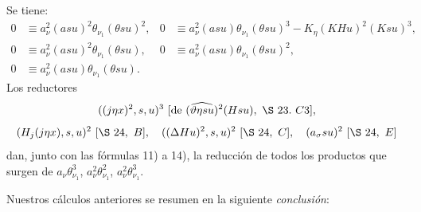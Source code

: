 \documentclass[11pt]{article}
\newcommand{\D}{\Delta}
\begin{document}
Se tiene:
\begin{align*}
0&\equiv a_\nu^2(asu)^2\theta_{\nu_1}(\theta su)^2,
&0&\equiv a_\nu^2(asu)\theta_{\nu_1}(\theta su)^3-K_\eta(KHu)^2(Ksu)^3,\\
0&\equiv a_\nu^2(asu)^2\theta_{\nu_1}(\theta su),
&0&\equiv a_\nu^2(asu)\theta_{\nu_1}(\theta su)^2,\\
0&\equiv a_\nu^2(asu)\theta_{\nu_1}(\theta su).
\end{align*}
Los reductores
\[
 ((j\eta x)^2,s,u)^3\ [\hbox{de }(\widehat{\vartheta\eta su})^2(Hsu),\ \S\ 23.\ C3],
\]
\[
(H_j(j\eta x),s,u)^2\ [\S\ 24,\ B],
\quad ((\D Hu)^2,s,u)^2\ [\S\ 24,\ C],
\quad (a_\sigma su)^2\ [\S\ 24,\ E]
\]
dan, junto con las fórmulas 11) a 14), la reducción de todos los productos que surgen de $a_\nu\theta_{\nu_1}^3$, $a_\nu^2\theta_{\nu_1}^2$, $a_\nu^2\theta_{\nu_1}^3$.

Nuestros cálculos anteriores se resumen en la siguiente \emph{conclusión}:
\end{document}
